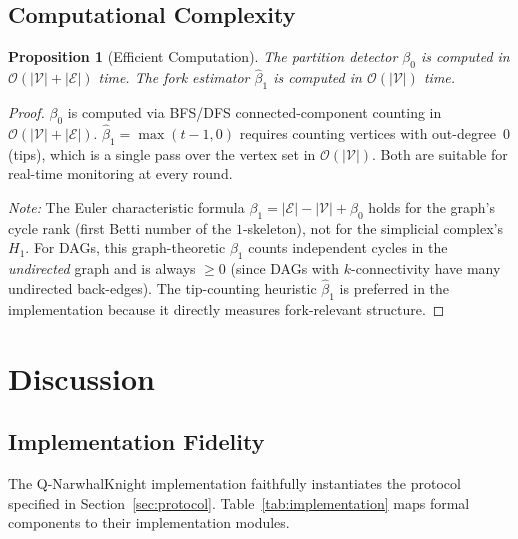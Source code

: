 \documentclass[11pt,a4paper]{article}
\newtheorem{proposition}[theorem]{Proposition}
\theoremstyle{definition}
\theoremstyle{remark}
\newcommand{\vertices}{\mathcal{V}}
\newcommand{\edges}{\mathcal{E}}
\newcommand{\bigO}{\mathcal{O}}
\begin{document}
\subsection{Computational Complexity}

\begin{proposition}[Efficient Computation]\label{prop:homology-complexity}
The partition detector $\beta_0$ is computed in $\bigO(|\vertices| + |\edges|)$
time.
The fork estimator $\hat{\beta}_1$ is computed in $\bigO(|\vertices|)$ time.
\end{proposition}

\begin{proof}
$\beta_0$ is computed via BFS/DFS connected-component counting in
$\bigO(|\vertices| + |\edges|)$.
$\hat{\beta}_1 = \max(t - 1, 0)$ requires counting vertices with
out-degree~0 (tips), which is a single pass over the vertex set in
$\bigO(|\vertices|)$.
Both are suitable for real-time monitoring at every round.

\emph{Note:} The Euler characteristic formula
$\beta_1 = |\edges| - |\vertices| + \beta_0$ holds for the graph's
cycle rank (first Betti number of the $1$-skeleton), not for the
simplicial complex's $H_1$.
For DAGs, this graph-theoretic $\beta_1$ counts independent cycles in
the \emph{undirected} graph and is always $\geq 0$ (since DAGs with
$k$-connectivity have many undirected back-edges).
The tip-counting heuristic $\hat{\beta}_1$ is preferred in the
implementation because it directly measures fork-relevant structure.
\end{proof}

\section{Discussion}\label{sec:discussion}

\subsection{Implementation Fidelity}

The Q-NarwhalKnight implementation faithfully instantiates the protocol
specified in Section~\ref{sec:protocol}.
Table~\ref{tab:implementation} maps formal components to their
implementation modules.
\end{document}

